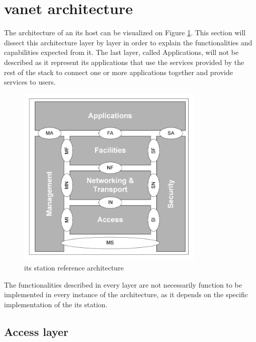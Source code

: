 \section[VANET architecture]{\gls{vanet} architecture}
\label{sec:vanet_arch}

The architecture of an \gls{its} host can be visualized on Figure \ref{fig:its_host}. This section will dissect this architecture layer by layer in order to explain the functionalities and capabilities expected from it. The last layer, called Applications, will not be described as it represent \gls{its} applications that use the services provided by the rest of the stack to connect one or more applications together and provide services to users\cite{etsi_intelligent_2010}.

\begin{figure}[htbp]
    \centering
   	\includegraphics[width=0.8\textwidth]{Chapters/Figures/VANETs/ITS-S_host_arch.png}
    \caption{\gls{its} station reference architecture~\cite{etsi_intelligent_2010}}
   	\label{fig:its_host}
\end{figure}

The functionalities described in every layer are not necessarily function to be implemented in every instance of the architecture, as it depends on the specific implementation of the \gls{its} station\cite{etsi_intelligent_2010}.

\subsection[Access layer]{Access layer}
\label{subsec:Access_layer}

